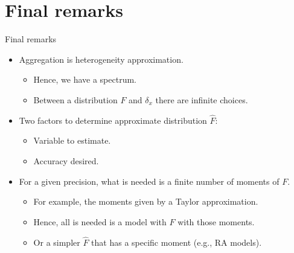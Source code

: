 \documentclass[10pt, handout]{beamer}
\begin{document}
\section{Final remarks}


\begin{frame}
	\tableofcontents[currentsection]
\end{frame}

\begin{frame}{Final remarks}
	\vfill
	\begin{itemize}
		\item Aggregation is heterogeneity approximation.\vspace{1ex}
			\begin{itemize}
				\item Hence, we have a spectrum.\vspace{1ex}
				\item Between a distribution $F$ and $\delta_{x}$ there are infinite choices.
			\end{itemize} \vfill

		\item Two factors to determine approximate distribution $\widehat{F}$:\vspace{1ex}
			\begin{itemize}
				\item Variable to estimate.\vspace{1ex}
				\item Accuracy desired.
			\end{itemize} \vfill

		\item For a given precision, what is needed is a finite number of moments of $F$.\vspace{1ex}
			\begin{itemize}
				\item For example, the moments given by a Taylor approximation.\vspace{1ex}
				\item Hence, all is needed is a model with $\widehat{F}$ with those moments.\vspace{1ex}
				\item Or a simpler $\widehat{F}$ that has a specific moment (e.g., RA models).
			\end{itemize}
	\end{itemize} \vfill

\end{frame}
\end{document}
